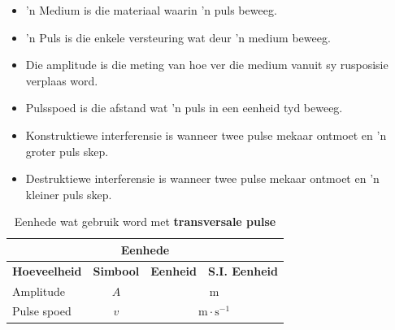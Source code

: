             \nopagebreak
            \label{m38802*eip-404}\begin{itemize}[noitemsep]
            \item 'n Medium is die materiaal waarin 'n puls beweeg.
	    \item 'n Puls is die enkele versteuring wat deur 'n medium beweeg. 
	    \item Die amplitude is die meting van hoe ver die medium vanuit sy rusposisie verplaas word. 
	    \item Pulsspoed is die afstand wat 'n puls in een eenheid tyd beweeg.
	    \item Konstruktiewe interferensie is wanneer twee pulse mekaar ontmoet en 'n groter puls skep.
	    \item Destruktiewe interferensie is wanneer twee pulse mekaar ontmoet en 'n kleiner puls skep.
	    \end{itemize}
        \label{m38802*cid9}
\begin{table}[H]
\begin{center}
\begin{tabular}{|l|c|c|c|}\hline \hline 
\multicolumn{4}{|c|}{\textbf{Eenhede}}\\ \hline \hline
\textbf{Hoeveelheid} & \textbf{Simbool} & \textbf{Eenheid} & \textbf{S.I. Eenheid}  \\ \hline
Amplitude & $A$ & \multicolumn{2}{c|}{m} \\ \hline
Pulse spoed & $v$ & \multicolumn{2}{c|}{$\text{m} \cdot \text{s}^{-1}$} \\ \hline
\end{tabular}
\end{center}
\caption{Eenhede wat gebruik word met \textbf{transversale pulse} }
\label{table:electricity::units}
\end{table}

